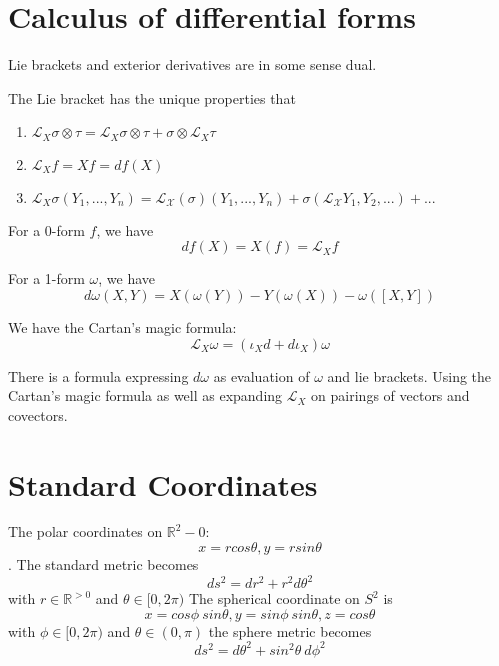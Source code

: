 \documentclass[main.tex]{subfiles}
\begin{document}
\section{Calculus of differential forms}
Lie brackets and exterior derivatives are in some sense dual.

The Lie bracket has the unique properties  that 
\begin{enumerate}
    \item $\mathcal{L}_X \sigma \otimes \tau = \mathcal{L}_X \sigma \otimes \tau + \sigma \otimes \mathcal{L}_X \tau$
    \item $\mathcal{L}_X f = X f = df (X)$
    \item $\mathcal{L}_X \sigma(Y_1, ..., Y_n) = \mathcal{L_X} (\sigma)(Y_1, ..., Y_n) + \sigma (\mathcal{L_X}Y_1, Y_2,...) + ...$
\end{enumerate}

For a 0-form $f$, we have 
$$
df(X) = X(f) = \mathcal{L}_X f
$$

For a 1-form $\omega$, we have 
$$
d\omega(X,Y) = X(\omega(Y)) - Y(\omega(X)) - \omega([X,Y])
$$

We have the Cartan's magic formula:
$$
\mathcal{L}_X \omega = (\iota_X d + d \iota_X) \omega
$$

There is a formula expressing $d\omega$ as evaluation of $\omega$ and lie brackets.
Using the Cartan's magic formula as well as expanding $\mathcal{L}_X$ on pairings of vectors and covectors.

\section{Standard Coordinates}
The polar coordinates on $\mathbb{R}^2 - {0}$:
$$
x = r cos \theta, y = r sin \theta
$$
. The standard metric becomes 
$$
ds^2 = dr^2 + r^2 d\theta^2
$$
with $r \in \mathbb{R}^{>0}$ and $\theta \in [0,2\pi)$
The spherical coordinate on $S^2$ is 
$$
x = cos \phi \ sin \theta, 
y = sin \phi \ sin \theta, 
z = cos \theta 
$$
with $\phi \in [0,2\pi)$ and $\theta \in (0, \pi)$
the sphere metric becomes 
$$
ds^2 = d\theta^2 + sin^2 \theta \ d\phi^2
$$
\end{document}
